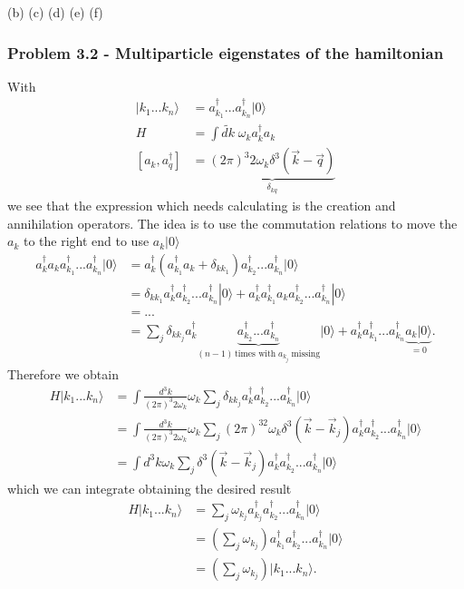 \documentclass[10pt,a4paper]{book}
\theoremstyle{definition}
\begin{document}
(b)
(c)
(d)
(e)
(f)

\subsubsection{Problem 3.2 - Multiparticle eigenstates of the hamiltonian}
With
\begin{align}
|k_1...k_n\rangle&=a^\dagger_{k_1}...a^\dagger_{k_n}|0\rangle\\
H&=\int\widetilde{dk}\;\omega_k a^\dagger_ka_k\\
[a_k,a_q^\dagger]&=\underbrace{(2\pi)^3 2\omega_k\delta^3(\vec{k}-\vec{q})}_{\delta_{kq}}
\end{align}
we see that the expression which needs calculating is the creation and annihilation operators. The idea is to use the commutation relations to move the $a_k$ to the right end to use $a_k|0\rangle$
\begin{align}
a^\dagger_ka_ka^\dagger_{k_1}...a^\dagger_{k_n}|0\rangle
&=a^\dagger_k(a^\dagger_{k_1}a_k+\delta_{kk_1})a^\dagger_{k_2}...a^\dagger_{k_n}|0\rangle\\
&=\delta_{kk_1}a^\dagger_ka^\dagger_{k_2}...a^\dagger_{k_n}|0\rangle
+a^\dagger_ka^\dagger_{k_1}a_ka^\dagger_{k_2}...a^\dagger_{k_n}|0\rangle\\
&=...\\
&=\sum_j\delta_{kk_j}a^\dagger_k\underbrace{a^\dagger_{k_2}...a^\dagger_{k_n}}_{(n-1)\, \text{times with}\;a_{k_j}\;\text{missing}}|0\rangle+a^\dagger_ka^\dagger_{k_1}...a^\dagger_{k_n}\underbrace{a_k|0\rangle}_{=0}.
\end{align}
Therefore we obtain
\begin{align}
H|k_1...k_n\rangle
&=\int\frac{d^3k}{(2\pi)^3 2\omega_k}\omega_k\sum_j\delta_{kk_j}a^\dagger_ka^\dagger_{k_2}...a^\dagger_{k_n}|0\rangle\\
&=\int\frac{d^3k}{(2\pi)^3 2\omega_k}\omega_k\sum_j(2\pi)^32\omega_k\delta^3(\vec{k}-\vec{k}_j)a^\dagger_ka^\dagger_{k_2}...a^\dagger_{k_n}|0\rangle\\
&=\int d^3k\omega_k\sum_j\delta^3(\vec{k}-\vec{k}_j)a^\dagger_ka^\dagger_{k_2}...a^\dagger_{k_n}|0\rangle
\end{align}
which we can integrate obtaining the desired result
\begin{align}
H|k_1...k_n\rangle
&=\sum_j\omega_{k_j}a^\dagger_{k_j}a^\dagger_{k_2}...a^\dagger_{k_n}|0\rangle\\
&=\left(\sum_j\omega_{k_j}\right)a^\dagger_{k_1}a^\dagger_{k_2}...a^\dagger_{k_n}|0\rangle\\
&=\left(\sum_j\omega_{k_j}\right)|k_1...k_n\rangle.
\end{align}
\end{document}
